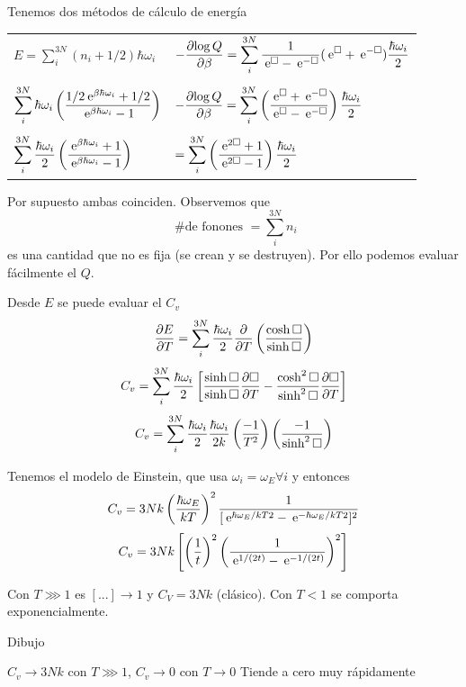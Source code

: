 \documentclass[10pt,oneside]{CBFT_book}
\begin{document}
Tenemos dos métodos de cálculo de energía
\begin{center}
\begin{tabular}{l|l}
$ \displaystyle E = \sum_i^{3N} ( n_i + 1/2 )\hbar\omega_i $ & 
$ \displaystyle -\frac{\partial^{\hspace{-0.05em}} {\log Q}}{\partial {\beta}^{\hspace{-0.05em}}} = \sum_i^{3N} \frac{1}{\:\mathrm{e}^\Box - \:\mathrm{e}^{-\Box}}( \:\mathrm{e}^\Box + 
\:\mathrm{e}^{-\Box} )\frac{\hbar\omega_i}{2} $ \\
& \\
$ \displaystyle \sum_i^{3N} \hbar\omega_i\left( \frac{ 1/2\:\mathrm{e}^{\beta\hbar\omega_i}+1/2 }{ \:\mathrm{e}^{\beta\hbar\omega_i}-1 } \right) $  & 
$ \displaystyle -\frac{\partial^{\hspace{-0.05em}} {\log Q}}{\partial {\beta}^{\hspace{-0.05em}}} = \sum_i^{3N} \left( \frac{ \:\mathrm{e}^\Box + \:\mathrm{e}^{-\Box} }{ \:\mathrm{e}^\Box - \:\mathrm{e}^{-\Box} } \right) 
\frac{\hbar\omega_i}{2} $ \\
& \\
$ \displaystyle \sum_i^{3N} \frac{\hbar\omega_i}{2}\left( \frac{ \:\mathrm{e}^{\beta\hbar\omega_i}+1 }{ \:\mathrm{e}^{\beta\hbar\omega_i}-1 } \right) $ 
& $ \displaystyle = \sum_i^{3N} \left( \frac{ \:\mathrm{e}^{2\Box} + 1  }{  \:\mathrm{e}^{2\Box} - 1  } \right) \frac{\hbar\omega_i}{2} $ \\
\end{tabular}
\end{center}

Por supuesto ambas coinciden. Observemos que 
\[
	\text{ \# de fonones } = \sum_i^{3N} n_i
\]
es una cantidad que no es fija (se crean y se destruyen). Por ello podemos evaluar fácilmente el
$Q$.

Desde $E$ se puede evaluar el $C_v$
\[
	\frac{\partial^{\hspace{-0.05em}} {E}}{\partial {T}^{\hspace{-0.05em}}} = \sum_i^{3N} \frac{\hbar\omega_i}{2} \frac{\partial^{\hspace{-0.05em}} {}}{\partial {T}^{\hspace{-0.05em}}}\left( \frac{  \cosh \Box  }{  \sinh \Box  } \right) 
\]
\[
	C_v = \sum_i^{3N} \frac{\hbar\omega_i}{2} \left[ 
	\frac{ \sinh \Box }{ \sinh \Box }\frac{\partial^{\hspace{-0.05em}} {\Box}}{\partial {T}^{\hspace{-0.05em}}} - \frac{ \cosh^2 \Box }{ \sinh^2 \Box } \frac{\partial^{\hspace{-0.05em}} {\Box}}{\partial {T}^{\hspace{-0.05em}}}
	\right]
\]
\[
	C_v = \sum_i^{3N} \frac{\hbar\omega_i}{2}  \frac{\hbar\omega_i}{2k} \left( \frac{ -1 }{ T^2 } \right) 
	\left( \frac{ -1 }{ \sinh^2 \Box } \right)
\]

Tenemos el modelo de Einstein, que usa $ \omega_i = \omega_E \forall i $ y entonces 
\[
	C_v = 3N k \left( \frac{ \hbar\omega_E }{ kT } \right)^2 \frac{1}{[\:\mathrm{e}^{\hbar\omega_E/kT2} -\:\mathrm{e}^{-\hbar\omega_E/kT2}]^2}
\]
\[
	C_v = 3Nk \left[ \left( \frac{ 1 }{ t } \right)^2 \left( \frac{ 1 }{ \:\mathrm{e}^{1/(2t)}-\:\mathrm{e}^{-1/(2t)}  } \right)^2 \right]
\]

Con $ T \ggg 1 $ es $ [ ... ] \to 1$ y $C_V = 3Nk $ (clásico). Con $ T < 1 $ se comporta exponencialmente.

Dibujo 

$ C_v \to 3Nk $  con $ T \ggg 1 $, $ C_v \to 0 $ con $ T \to 0 $ Tiende a cero muy rápidamente
\end{document}
